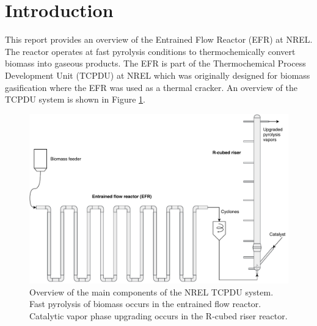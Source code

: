 
\section{Introduction}

This report provides an overview of the Entrained Flow Reactor (EFR) at NREL. The reactor operates at fast pyrolysis conditions to thermochemically convert biomass into gaseous products. The EFR is part of the Thermochemical Process Development Unit (TCPDU) at NREL which was originally designed for biomass gasification where the EFR was used as a thermal cracker. An overview of the TCPDU system is shown in Figure \ref{fig:tcpdu-system}.

\begin{figure}[H]
    \centering
    \includegraphics[width=\textwidth]{figures/tcpdu-system.pdf}
    \caption{Overview of the main components of the NREL TCPDU system. Fast pyrolysis of biomass occurs in the entrained flow reactor. Catalytic vapor phase upgrading occurs in the R-cubed riser reactor.}
    \label{fig:tcpdu-system}
\end{figure}
